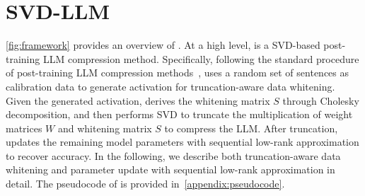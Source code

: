 \vspace{-1mm}
\section{SVD-LLM}
\label{sec:methodology}
\vspace{-1mm}
%
\cref{fig:framework} provides an overview of \sysname. 
At a high level, \sysname is a SVD-based post-training LLM compression method.
% 
Specifically, following the standard procedure of post-training LLM compression methods~\citep{DBLP:conf/icml/FrantarA23,DBLP:journals/corr/abs-2312-05821,DBLP:conf/icml/XiaoLSWDH23},
\sysname uses a random set of sentences as calibration data to generate activation for truncation-aware data whitening. 
%
Given the generated activation, \sysname derives the whitening matrix $S$ through Cholesky decomposition, and then performs SVD to truncate the multiplication of weight matrices $W$ and whitening matrix $S$ to compress the LLM.
After truncation, \sysname updates the remaining model parameters with sequential low-rank approximation to recover accuracy.
%
In the following, we describe both truncation-aware data whitening and parameter update with sequential low-rank approximation in detail. The pseudocode of \sysname is provided in~\cref{appendix:pseudocode}.




